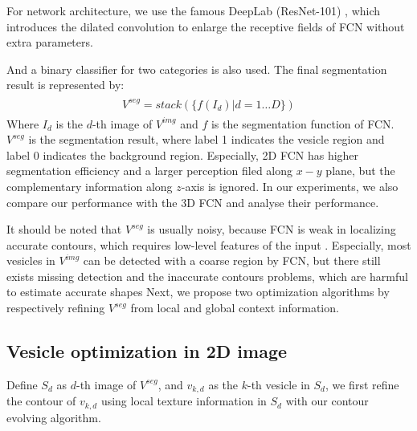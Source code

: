 For network architecture, we use the famous DeepLab (ResNet-101) \cite{Chen2018}, which introduces the dilated convolution to enlarge the receptive fields of FCN without extra parameters.





And a binary classifier for two categories is also used. 
The final segmentation result is represented by:
\begin{eqnarray}\label{eq:FCN2}
\begin{aligned}
V^{seg}=stack(\{f(I_d)|d=1\ldots D\})
\end{aligned}
\end{eqnarray}
Where $I_d$ is the $d$-th image of $V^{img}$ and $f$ is the segmentation function of FCN.
$V^{seg}$ is the segmentation result, where label 1 indicates the vesicle region and label 0 indicates the background region.
Especially, 2D FCN has higher segmentation efficiency and a larger perception filed along $x-y$ plane, but the complementary information along $z$-axis is ignored.
In our experiments, we also compare our performance with the 3D FCN and analyse their performance.

It should be noted that $V^{seg}$ is usually noisy, because FCN is weak in localizing accurate contours, which requires low-level features of the input \cite{Chen2017}.
Especially, most vesicles in $V^{img}$ can be detected with a coarse region by FCN, but there still exists missing detection and the inaccurate contours problems, which are harmful to estimate accurate shapes
Next, we propose two optimization algorithms by respectively refining  $V^{seg}$ from local and global context information.

\subsection{Vesicle optimization in 2D image}
Define $S_d$ as $d$-th image of $V^{seg}$, and $v_{k,d}$ as the $k$-th vesicle in $S_d$, we first refine the contour of $v_{k,d}$ using local texture information in $S_d$ with our contour evolving algorithm.

